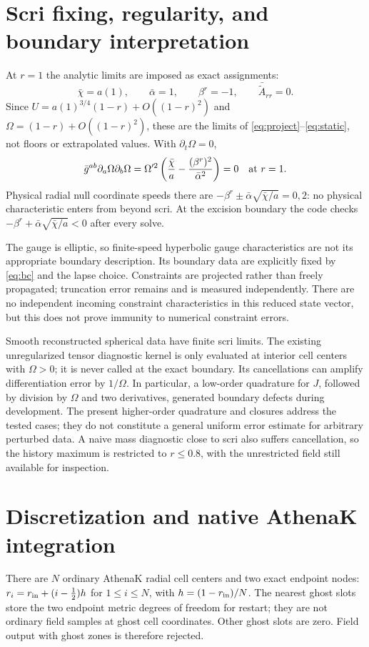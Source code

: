 \documentclass[11pt]{article}
\newcommand{\Om}{\Omega}
\newcommand{\bc}{\bar\chi}
\newcommand{\ba}{\bar\alpha}
\newcommand{\Ac}{\bar{\tilde A}}
\begin{document}
\section{Scri fixing, regularity, and boundary interpretation}
At $r=1$ the analytic limits are imposed as exact assignments:
\begin{equation}
 \bc=a(1),\qquad \ba=1,\qquad \beta^r=-1,\qquad \Ac_{rr}=0.
 \label{eq:scri}
\end{equation}
Since $U=a(1)^{3/4}(1-r)+O((1-r)^2)$ and
$\Om=(1-r)+O((1-r)^2)$, these are the limits of
\eqref{eq:project}--\eqref{eq:static}, not floors or extrapolated values.
With $\partial_t\Om=0$,
\begin{equation}
 \bar g^{ab}\partial_a\Om\partial_b\Om
 =\Om'^2\left(\frac{\bc}{a}-\frac{(\beta^r)^2}{\ba^2}\right)=0
 \quad\hbox{at }r=1.
\end{equation}
Physical radial null coordinate speeds there are
$-\beta^r\pm\ba\sqrt{\bc/a}=0,2$: no physical characteristic enters from beyond
scri. At the excision boundary the code checks
$-\beta^r+\ba\sqrt{\bc/a}<0$ after every solve.

The gauge is elliptic, so finite-speed hyperbolic gauge characteristics are not
its appropriate boundary description. Its boundary data are explicitly fixed
by \eqref{eq:bc} and the lapse choice. Constraints are projected rather than
freely propagated; truncation error remains and is measured independently.
There are no independent incoming constraint characteristics in this reduced
state vector, but this does not prove immunity to numerical constraint errors.

Smooth reconstructed spherical data have finite scri limits. The existing
unregularized tensor diagnostic kernel is only evaluated at interior cell
centers with $\Om>0$; it is never called at the exact boundary. Its cancellations
can amplify differentiation error by $1/\Om$. In particular, a low-order
quadrature for $J$, followed by division by $\Om$ and two derivatives, generated
boundary defects during development. The present higher-order quadrature and
closures address the tested cases; they do not constitute a general uniform
error estimate for arbitrary perturbed data. A naive mass diagnostic close to
scri also suffers cancellation, so the history maximum is restricted to
$r\leq0.8$, with the unrestricted field still available for inspection.

\section{Discretization and native AthenaK integration}
There are $N$ ordinary AthenaK radial cell centers and two exact endpoint nodes:
$r_i=r_{\rm in}+(i-\frac12)h$ for $1\leq i\leq N$, with
$h=(1-r_{\rm in})/N$. The nearest ghost slots store the two endpoint metric
degrees of freedom for restart; they are not ordinary field samples at ghost
cell coordinates. Other ghost slots are zero. Field output with ghost zones is
therefore rejected.
\end{document}

